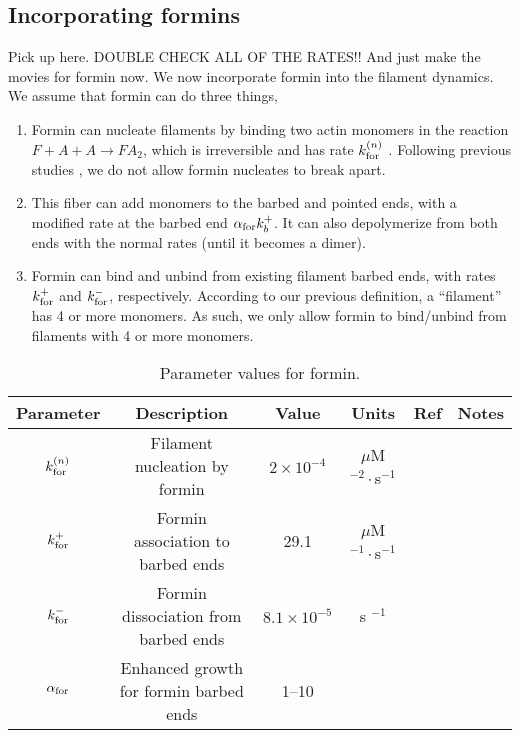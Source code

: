 \documentclass[11pt]{article}
\newcommand{\red}[1]{\color{red}#1\normalcolor}
\begin{document}
\subsection{Incorporating formins}
\red{Pick up here. DOUBLE CHECK ALL OF THE RATES!! And just make the movies for formin now. } We now incorporate formin into the filament dynamics. We assume that formin can do three things,
\begin{enumerate}
\item Formin can nucleate filaments by binding two actin monomers in the reaction $F+A+A \rightarrow FA_2$, which is irreversible and has rate $k_\text{for}^{(n)}$ \cite{paul2008role, zweifel2021nucleation}. Following previous studies \cite{paul2008role, zweifel2021nucleation}, we do not allow formin nucleates to break apart. 
\item This fiber can add monomers to the barbed and pointed ends, with a modified rate at the barbed end $\alpha_\text{for} k_b^+$. It can also depolymerize from both ends with the normal rates (until it becomes a dimer).
\item Formin can bind and unbind from existing filament barbed ends, with rates $k_\text{for}^+$ and $k_\text{for}^-$, respectively. According to our previous definition, a ``filament'' has 4 or more monomers. As such, we only allow formin to bind/unbind from filaments with 4 or more monomers.
\end{enumerate}


\begin{table}
\begin{center}
\begin{tabular}{|c|c|c|c|c|c|}\hline
Parameter & Description & Value & Units & Ref & Notes \\ \hline
$k_\text{for}^{(n)}$ & Filament nucleation by formin & $2 \times 10^{-4}$ & $\mu$M$^{-2}\cdot$s$^{-1}$& \cite{paul2008role} & \\ 
$k_\text{for}^+$ & Formin association to barbed ends& 29.1 & $\mu$M$^{-1} \cdot $s$^{-1}$ & \cite{shekhar2015formin}& \\
$k_\text{for}^-$ & Formin dissociation from barbed ends& $8.1 \times 10^{-5}$ & s $^{-1}$ & \cite{shekhar2015formin}& \\
$\alpha_\text{for}$ & Enhanced growth for formin barbed ends & 1--10 & & &\\ \hline
\end{tabular}
\caption{\label{tab:paramsF} Parameter values for formin.}
\end{center}
\end{table}
\end{document}
